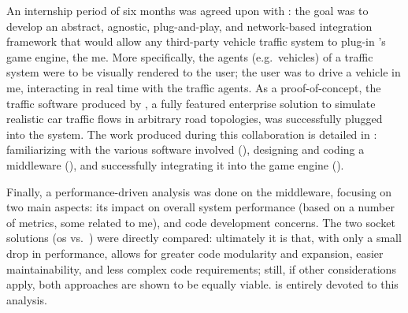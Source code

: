 An internship period of six months was agreed upon with : the goal was to develop an abstract, agnostic, plug-and-play, and network-based integration framework that would allow any third-party vehicle traffic system to plug-in 's game engine, the \gls{me}. More specifically, the agents (e.g.\ vehicles) of a traffic system were to be visually rendered to the user; the user was to drive a vehicle in \gls{me}, interacting in real time with the traffic agents. As a proof-of-concept, the traffic software produced by , a fully featured enterprise solution to simulate realistic car traffic flows in arbitrary road topologies, was successfully plugged into the system. The work produced during this collaboration is detailed in : familiarizing with the various software involved (), designing and coding a \gls{middleware} (), and successfully integrating it into the game engine ().


Finally, a performance-driven analysis was done on the \gls{middleware}, focusing on two main aspects: its impact on overall system performance (based on a number of metrics, some related to \gls{me}), and code development concerns. The two socket solutions (\gls{os} vs.\ ) were directly compared: ultimately it is  that, with only a small drop in performance, allows for greater code modularity and expansion, easier maintainability, and less complex code requirements; still, if other considerations apply, both approaches are shown to be equally viable.  is entirely devoted to this analysis.
